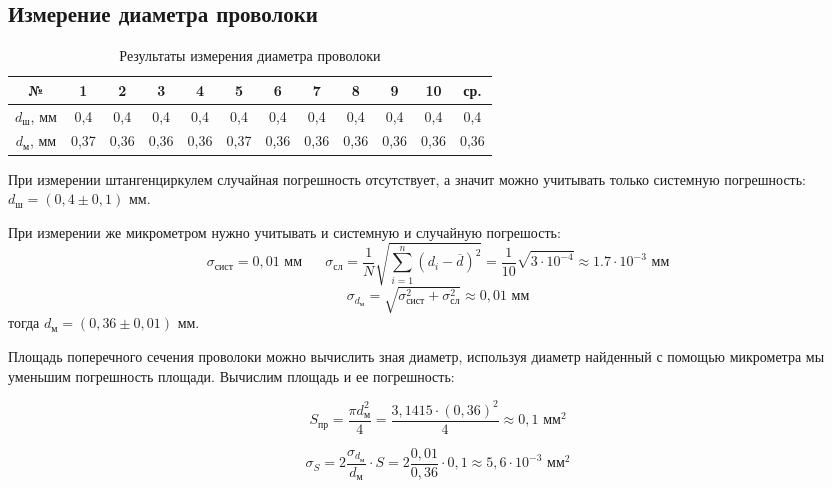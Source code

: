 \documentclass[a4paper, 12pt]{article}
\begin{document}
	\begin{center}
	\subsection*{Измерение диаметра проволоки}
        \end{center}
	\begin{table}[h]
		\begin{center}
			\begin{tabular}{|c|c|c|c|c|c|c|c|c|c|c|c|}
				\hline
				№ & 1 & 2 & 3 & 4 & 5 & 6 & 7 & 8 & 9 & 10 & ср. \\
				\hline
				$d_\text{ш}$, мм & 0,4 & 0,4& 0,4& 0,4& 0,4& 0,4& 0,4& 0,4& 0,4& 0,4& 0,4\\ 
				\hline
				$d_\text{м}$, мм & 0,37 & 0,36 & 0,36 & 0,36 & 0,37& 0,36& 0,36& 0,36& 0,36& 0,36& 0,36\\ 
				\hline
			\end{tabular}
		\end{center}
		\caption{Результаты измерения диаметра проволоки}
		\label{dtab}
	\end{table}
	
	При измерении штангенциркулем случайная погрешность отсутствует, а значит можно учитывать только системную погрешность: $d_\text{ш} = \left( 0,4 \pm 0,1 \right) \text{ мм}$.

	При измерении же микрометром нужно учитывать и системную и случайную погрешость:
	$$\sigma_\text{сист}=0,01\text{ мм}\;\;\;\;\;\; \sigma_\text{сл}=\frac{1}{N} \sqrt{\sum_{i=1}^{n}(d_i - \overline{d})^2}=\frac{1}{10} \sqrt{3\cdot 10^{-4}}\approx 1.7\cdot 10^{-3} \text{ мм}$$
	$$\sigma_{d_\text{м}} = \sqrt{\sigma_\text{сист}^2+\sigma_\text{сл}^2}\approx 0,01 \text{ мм}$$
	\noindent тогда $d_\text{м} = \left( 0,36 \pm 0,01 \right) \text{ мм}$.
	
	Площадь поперечного сечения проволоки можно вычислить зная диаметр, используя диаметр найденный с помощью микрометра мы уменьшим погрешность площади. Вычислим площадь и ее погрешность:
	
	\begin{equation}
		S_\text{пр} = \frac{\pi d_\text{м}^2}{4} = \frac{3,1415\cdot (0,36)^2}{4} \approx 0,1 \text{ мм}^2
	\end{equation}
	
	\begin{equation}
		\sigma_S = 2\frac{\sigma_{d_\text{м}}}{d_\text{м}}\cdot S = 2\frac{0,01}{0,36} \cdot 0,1 \approx 5,6\cdot 10^{-3} \text{ мм}^2
	\end{equation}
\end{document}
